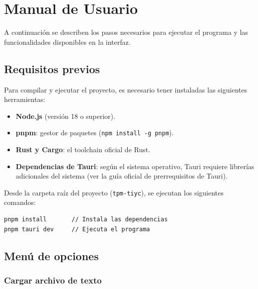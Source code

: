 \chapter*{Manual de Usuario}


A continuación se describen los pasos necesarios para ejecutar el programa y las funcionalidades disponibles en la interfaz.

\section*{Requisitos previos}


Para compilar y ejecutar el proyecto, es necesario tener instaladas las siguientes herramientas:
\begin{itemize}
    \item \textbf{Node.js} (versión 18 o superior).
    \item \textbf{pnpm}: gestor de paquetes (\texttt{npm install -g pnpm}).
    \item \textbf{Rust y Cargo}: el toolchain oficial de Rust.
    \item \textbf{Dependencias de Tauri}: según el sistema operativo, Tauri requiere librerías adicionales del sistema (ver la guía oficial de prerrequisitos de Tauri).
\end{itemize}


Desde la carpeta raíz del proyecto (\texttt{tpm-tiyc}), se ejecutan los siguientes comandos:
\begin{verbatim}
pnpm install       // Instala las dependencias
pnpm tauri dev     // Ejecuta el programa
\end{verbatim}


\section*{Menú de opciones}


\subsection*{Cargar archivo de texto}


